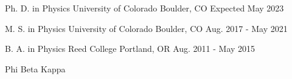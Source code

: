 

\begin{cventries}
  \cventry
  {Ph. D. in Physics}
  {University of Colorado}
  {Boulder, CO}
  {Expected May 2023}
  {}

  \cventry
  {M. S. in Physics}
  {University of Colorado}
  {Boulder, CO}
  {Aug. 2017 - May 2021}
  {}

  \cventry
{B. A. in Physics} %
{Reed College} %
{Portland, OR} %
{Aug. 2011 - May 2015} %
{\begin{cvitems}
\item {Phi Beta Kappa}
\end{cvitems}
}

\end{cventries}

